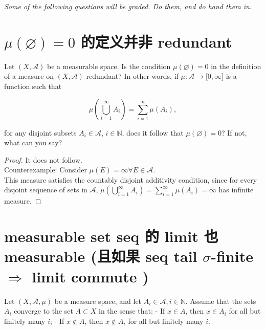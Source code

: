 \emph{Some of the following questions will be graded. Do them, and do hand them in}.

\section{\texorpdfstring{\(\mu(\varnothing) = 0\) 的定义并非 redundant}{\textbackslash mu(\textbackslash varnothing) = 0 的定义并非 redundant}}\label{muemptyset-0-ux7684ux5b9aux4e49ux5e76ux975e-redundant}

Let \((X,\mathcal{A})\) be a measurable space. Is the condition \(\mu(\varnothing) = 0\) in the definition of a measure on \((X,\mathcal{A})\) redundant? In other words, if \(\mu:\mathcal{A}\rightarrow\lbrack 0,\infty\rbrack\) is a function such that

\[\mu\left( {\bigcup\limits_{i = 1}^{\infty}A_{i}} \right) = \sum\limits_{i = 1}^{\infty}\mu(A_{i}),\]

for any disjoint subsets \(A_{i} \in \mathcal{A}\), \(i \in \mathbb{N}\), does it follow that \(\mu(\varnothing) = 0\)? If not, what can you say?

\begin{proof}

It does not follow.\\
Counterexample: Consider \(\mu(E) = \infty\forall E \in \mathcal{A}\).\\
This measure satisfies the countably disjoint additivity condition, since for every disjoint sequence of sets in \(\mathcal{A}\), \(\mu\left( {\bigcup_{i = 1}^{\infty}A_{i}} \right) = \sum_{i = 1}^{\infty}\mu(A_{i}) = \infty\) has infinite measure.

\end{proof}

\section{\texorpdfstring{measurable set seq 的 limit 也 measurable (且如果 seq tail \(\sigma\)-finite \(\Longrightarrow\) limit commute )}{measurable set seq 的 limit 也 measurable (且如果 seq tail \textbackslash sigma-finite \textbackslash Longrightarrow limit commute )}}\label{measurable-set-seq-ux7684-limit-ux4e5f-measurable-ux4e14ux5982ux679c-seq-tail-sigma-finite-implies-limit-commute}

Let \((X,\mathcal{A},\mu)\) be a measure space, and let \(A_{i} \in \mathcal{A},i \in \mathbb{N}\). Assume that the sets \(A_{i}\) converge to the set \(A \subset X\) in the sense that: - If \(x \in A\), then \(x \in A_{i}\) for all but finitely many \(i\); - If \(x \notin A\), then \(x \notin A_{i}\) for all but finitely many \(i\).

